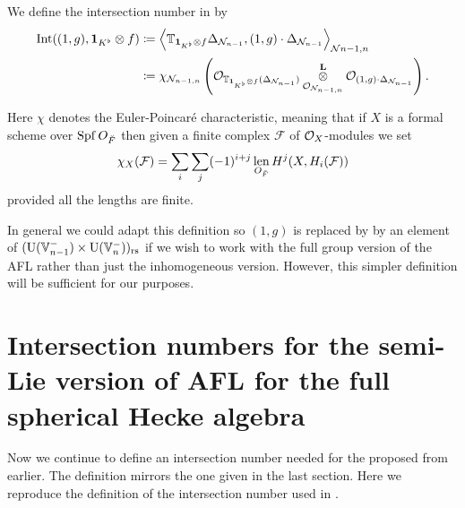 \begin{definition}
  \label{def:intersection_number_inhomog}
  We define the intersection number in  by
  \begin{align*}
    \operatorname{Int}((1,g), \mathbf{1}_{K^\flat} \otimes f)
    &\coloneqq \left\langle
      \mathbb T_{\mathbf{1}_{K^\flat} \otimes f} \Delta_{\mathcal N_{n-1}},
      (1,g) \cdot \Delta_{\mathcal N_{n-1}} \right\rangle _{\mathcal N{n-1,n}} \\
    &\coloneqq \chi_{\mathcal N_{n-1,n}} \left(
      \mathcal{O}_{\mathbb T_{\mathbf{1}_{K^\flat} \otimes f} (\Delta_{\mathcal N_{n-1}})}
      \mathop{\otimes}^{\mathbf{L}}_{\mathcal{O}_{\mathcal N_{n-1,n}}} \mathcal{O}_{(1,g) \cdot \Delta_{\mathcal N_{n-1}}} \right).
  \end{align*}
\end{definition}

Here $\chi$ denotes the Euler-Poincar\'{e} characteristic,
meaning that if $X$ is a formal scheme over $\operatorname{Spf} O_{\breve F}$
then given a finite complex $\mathcal{F}$ of $\mathcal{O}_X$-modules we set
\[ \chi_X(\mathcal{F}) = \sum_i \sum_j (-1)^{i+j}
  \operatorname*{len}_{O_{\breve F}} H^j(X, H_i(\mathcal F)) \]
provided all the lengths are finite.

\begin{remark}
  In general we could adapt this definition so $(1,g)$ is replaced by
  by an element of $(\operatorname{U}(\mathbb V_{n-1}^-) \times \operatorname{U}(\mathbb V_n^-))_{\mathrm{rs}}$
  if we wish to work with the full group version of the AFL
  rather than just the inhomogeneous version.
  However, this simpler definition will be sufficient for our purposes.
\end{remark}

\section{Intersection numbers for the semi-Lie version of AFL for the full spherical Hecke algebra}
Now we continue to define an intersection number needed for the proposed
 from earlier.
The definition mirrors the one given in the last section.
Here we reproduce the definition of the intersection number used in .


